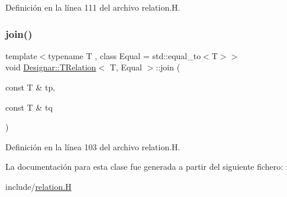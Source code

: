 Definición en la línea 111 del archivo relation.\+H.

\mbox{\label{class_designar_1_1_t_relation_a484b21a54f5d2b9862487fbb8b5ac1e7}} 
\subsubsection{\texorpdfstring{join()}{join()}}
{\footnotesize\ttfamily template$<$typename T , class Equal  = std\+::equal\+\_\+to$<$\+T$>$$>$ \\
void \hyperlink{class_designar_1_1_t_relation}{Designar\+::\+T\+Relation}$<$ T, Equal $>$\+::join (\begin{DoxyParamCaption}\item[{const T \&}]{tp,  }\item[{const T \&}]{tq }\end{DoxyParamCaption})\hspace{0.3cm}{\ttfamily [inline]}}



Definición en la línea 103 del archivo relation.\+H.



La documentación para esta clase fue generada a partir del siguiente fichero\+:\begin{DoxyCompactItemize}
\item 
include/\hyperlink{relation_8_h}{relation.\+H}\end{DoxyCompactItemize}
